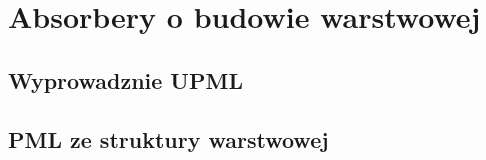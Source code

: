 \chapter{Absorbery o budowie warstwowej}
\label{roz:pml}

\section{Wyprowadznie UPML}

\section{PML ze struktury warstwowej~\cite{ania2015}}

